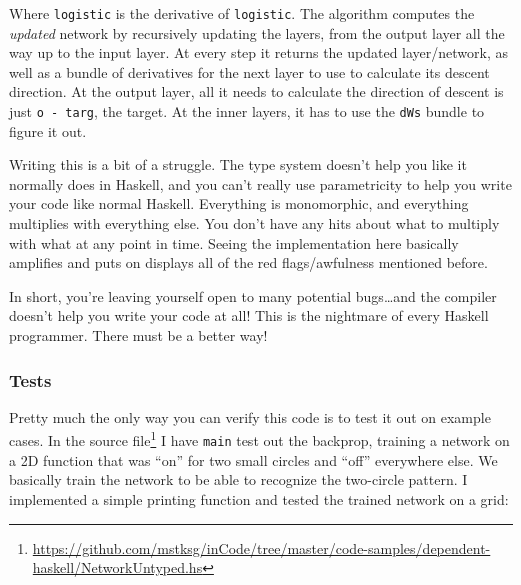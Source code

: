 \documentclass[]{article}
\newenvironment{Shaded}{}{}
\newcommand{\KeywordTok}[1]{\textcolor[rgb]{0.00,0.44,0.13}{\textbf{{#1}}}}
\newcommand{\CommentTok}[1]{\textcolor[rgb]{0.38,0.63,0.69}{\textit{{#1}}}}
\newcommand{\NormalTok}[1]{{#1}}
\renewcommand{\href}[2]{#2\footnote{\url{#1}}}
\begin{document}
Where \texttt{logistic\textquotesingle{}} is the derivative of
\texttt{logistic}. The algorithm computes the \emph{updated} network by
recursively updating the layers, from the output layer all the way up to
the input layer. At every step it returns the updated layer/network, as
well as a bundle of derivatives for the next layer to use to calculate
its descent direction. At the output layer, all it needs to calculate
the direction of descent is just \texttt{o\ -\ targ}, the target. At the
inner layers, it has to use the \texttt{dWs} bundle to figure it out.

Writing this is a bit of a struggle. The type system doesn't help you
like it normally does in Haskell, and you can't really use parametricity
to help you write your code like normal Haskell. Everything is
monomorphic, and everything multiplies with everything else. You don't
have any hits about what to multiply with what at any point in time.
Seeing the implementation here basically amplifies and puts on displays
all of the red flags/awfulness mentioned before.

In short, you're leaving yourself open to many potential bugs\ldots{}and
the compiler doesn't help you write your code at all! This is the
nightmare of every Haskell programmer. There must be a better way!

\subsubsection{Tests}\label{tests}

Pretty much the only way you can verify this code is to test it out on
example cases. In the
\href{https://github.com/mstksg/inCode/tree/master/code-samples/dependent-haskell/NetworkUntyped.hs}{source
file} I have \texttt{main} test out the backprop, training a network on
a 2D function that was ``on'' for two small circles and ``off''
everywhere else. We basically train the network to be able to recognize
the two-circle pattern. I implemented a simple printing function and
tested the trained network on a grid:

\begin{Shaded}
\end{Shaded}
\end{document}

